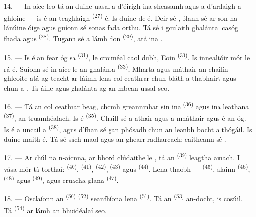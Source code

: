 14. --- In aice leo tá an duine uasal a d'éirigh ina sheasamh agus a d'ardaigh a
ghloine --- is é  an teaghlaigh \textsuperscript{(27)} é. Is duine de
 é. Deir sé , ólann sé ar son
 na lánúine óige agus guíonn sé sonas fada orthu. Tá sé i gculaith
ghalánta: casóg fhada agus  \textsuperscript{(28)}. Tugann sé
a lámh don  \textsuperscript{(29)}, atá ina
.

15. --- Is é an fear óg sa  \textsuperscript{(31)}, le
croiméal caol dubh,  Eoin \textsuperscript{(30)}. Is
innealtóir mór le rá é. Suíonn sé in aice le  an-ghalánta
\textsuperscript{(33)},  Mharta agus máthair an chailín
ghleoite atá ag teacht ar láimh lena col ceathrar chun bláth a thabhairt agus chun
 a . Tá  áille agus
 ghalánta ag an mbean uasal seo.

16. --- Tá an col ceathrar beag, chomh greannmhar sin ina 
\textsuperscript{(36)} agus ina  leathana \textsuperscript{(37)},
an-truamhéalach. Is  é \textsuperscript{(35)}. Chaill sé a
athair agus a mháthair agus é an-óg. Is é a uncail a 
\textsuperscript{(38)}, agus d'fhan sé gan phósadh chun an leanbh bocht a thógáil.
Is duine maith é. Tá sé sách maol agus an-ghearr-radharcach; caitheann sé
.

\VUsaut{2.4mm}
\VUsaut{3.0mm}

17. --- Ar chúl na n-aíonna, ar bhord clúdaithe le , tá an
 \textsuperscript{(39)} leagtha amach. I vása mór tá torthaí:
 \textsuperscript{(40)}, 
\textsuperscript{(41)},  \textsuperscript{(42)}, 
\textsuperscript{(43)} agus  \textsuperscript{(44)}. Lena thaobh
---  \textsuperscript{(45)},  álainn
\textsuperscript{(46)},  \textsuperscript{(48)} agus
 \textsuperscript{(49)}, agus cruacha  glana
\textsuperscript{(47)}.

18. --- Osclaíonn an  \textsuperscript{(50)} 
\textsuperscript{(52)} seanfhíona lena  \textsuperscript{(51)}.
Tá an  \textsuperscript{(53)} an-docht, is cosúil. Tá
 \textsuperscript{(54)} ar lámh an bhuidéalaí seo.

